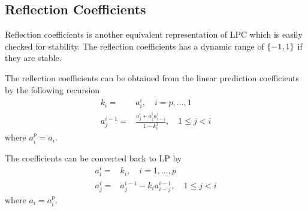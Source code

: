 \subsection{Reflection Coefficients} %
\label{sub:reflection_coefficients}
Reflection coefficients is another equivalent representation of LPC which is easily checked for stability. The reflection coefficients has a dynamic range of $\lbrace-1,1\rbrace$ if they are stable. 

The reflection coefficients can be obtained from the linear prediction coefficients by the following recursion
\begin{equation}
	\begin{split}
		k_i = & a_i^i, \quad i=p,\dotsc,1 \\
		a_j^{i-1} = & \frac{a_j^i+a_j^î a_{i-j}^i}{1-k_i^2}, \quad 1\leq j<i
	\end{split}
\end{equation}
where $a_i^p=a_i$.

The coefficients can be converted back to LP by \cite{taletek}
\begin{equation}
	\begin{split}
		a_i^i = & k_i, \quad i=1,\dotsc,p \\
		a_j^i = & a_j^{i-1}-k_i a_{i-j}^{i-1}, \quad 1\leq j<i
	\end{split}
\end{equation}
where $a_i=a_i^p$.


